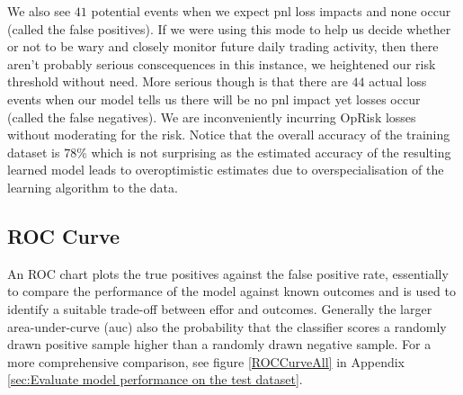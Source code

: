 \documentclass{DissertateUSU}
\begin{document}
We also see \(41\) potential events when we expect pnl loss impacts and
none occur (called the false positives). If we were using this mode to
help us decide whether or not to be wary and closely monitor future
daily trading activity, then there aren't probably serious conscequences
in this instance, we heightened our risk threshold without need. More
serious though is that there are \(44\) actual loss events when our
model tells us there will be no pnl impact yet losses occur (called the
false negatives). We are inconveniently incurring OpRisk losses without
moderating for the risk. Notice that the overall accuracy of the
training dataset is \(78\)\% which is not surprising as the estimated
accuracy of the resulting learned model leads to overoptimistic
estimates due to overspecialisation of the learning algorithm to the
data.

\singlespacing

\doublespacing

\subsection{ROC Curve}

An ROC chart plots the true positives against the false positive rate,
essentially to compare the performance of the model against known
outcomes and is used to identify a suitable trade-off between effor and
outcomes. Generally the larger area-under-curve (auc) also the
probability that the classifier scores a randomly drawn positive sample
higher than a randomly drawn negative sample. For a more comprehensive
comparison, see figure \ref{ROCCurveAll} in Appendix
\ref{sec:Evaluate model performance on the test dataset}.
\end{document}
